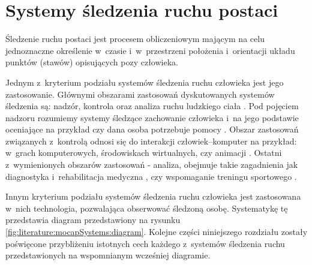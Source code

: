 \section{Systemy śledzenia ruchu postaci} \label{sec:literature:mocapSystems}

Śledzenie ruchu postaci jest procesem obliczeniowym mającym na celu jednoznaczne określenie w~czasie i~w~przestrzeni położenia i~orientacji układu punktów (stawów) opisujących pozy człowieka. 

Jednym z~kryterium podziału systemów śledzenia ruchu człowieka jest jego zastosowanie. Głównymi obszarami zastosowań dyskutowanych systemów śledzenia są: nadzór, kontrola oraz analiza ruchu ludzkiego ciała \cite{Moeslund2001}. Pod pojęciem nadzoru rozumiemy systemy śledzące zachowanie człowieka i~na jego podstawie oceniające na przykład czy dana osoba potrzebuje pomocy \cite{Kwolek, Kepski2016, Haritaoglu}. Obszar zastosowań związanych z~kontrolą odnosi się do interakcji człowiek--komputer na przykład: w~grach komputerowych, środowiskach wirtualnych, czy animacji \cite{Moeslund2001a}. Ostatni z~wymienionych obszarów zastosowań - analiza, obejmuje takie zagadnienia jak diagnostyka i~rehabilitacja medyczna  , czy wspomaganie treningu sportowego \cite{Neville2010,Noiumkar2013}.

Innym kryterium podziału systemów śledzenia ruchu człowieka jest zastosowana w~nich technologia, pozwalająca obserwować śledzoną osobę. Systematykę tę przedstawia diagram przedstawiony na rysunku \ref{fig:literature:mocapSystems:diagram}. Kolejne części niniejszego rozdziału zostały poświęcone przybliżeniu istotnych cech każdego z~systemów śledzenia ruchu przedstawionych na wspomnianym wcześniej diagramie.

